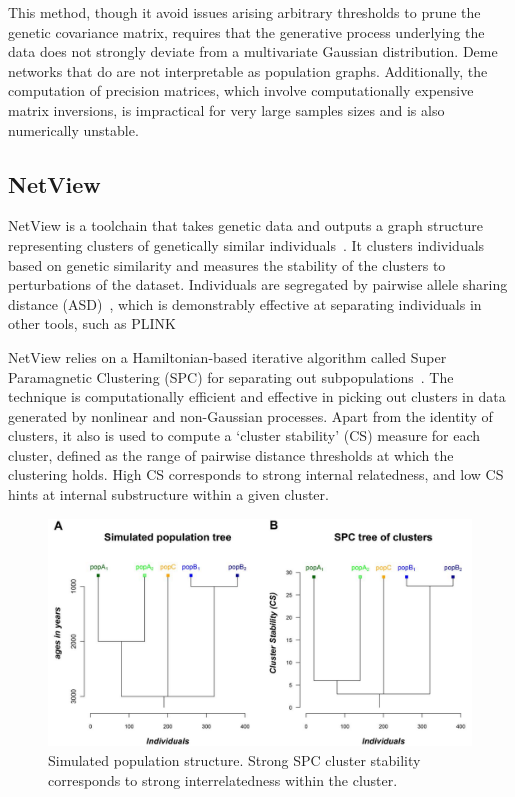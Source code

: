 \documentclass{essay}
\begin{document}
This method, though it avoid issues arising arbitrary thresholds to prune
the genetic covariance matrix, requires that the generative process underlying
the data does not strongly deviate from a multivariate Gaussian distribution.
Deme networks that do are not interpretable as population graphs. Additionally,
the computation of precision matrices, which involve computationally expensive
matrix inversions, is impractical for very large samples sizes and is also
numerically unstable.

\subsection{NetView}

NetView is a toolchain that takes genetic data and outputs a graph structure
representing clusters of genetically similar
individuals~\cite{neuditschko_netview:_2012}. It clusters individuals based on
genetic similarity and measures the stability of the clusters to perturbations
of the dataset. Individuals are segregated by pairwise allele sharing distance
(ASD)~\cite{gao_using_2009}, which is demonstrably effective at separating
individuals in other tools, such as PLINK~\cite{purcell_plink:_2007}

NetView relies on a Hamiltonian-based iterative algorithm called Super
Paramagnetic Clustering (SPC) for separating out
subpopulations~\cite{blatt_superparamagnetic_1996}. The technique is
computationally efficient and effective in picking out clusters in data
generated by nonlinear and non-Gaussian processes. Apart from the identity of
clusters, it also is used to compute a `cluster stability' (CS) measure for
each cluster, defined as the range of pairwise distance thresholds at which the
clustering holds. High CS corresponds to strong internal relatedness, and low
CS hints at internal substructure within a given cluster. 

\begin{figure}
  \includegraphics[width=1\linewidth,keepaspectratio]{../Figures/fig6ab.png}
  \caption{Simulated population structure. Strong SPC cluster stability
  corresponds to strong interrelatedness within the
  cluster\cite{neuditschko_netview:_2012}.}
\end{figure}
\end{document}
